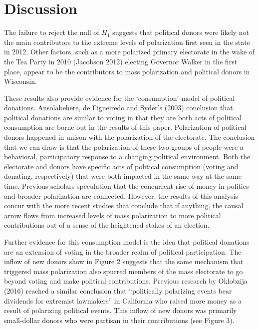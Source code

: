 \documentclass[12pt,]{article}
\begin{document}
\hypertarget{discussion}{%
\section{Discussion}\label{discussion}}

The failure to reject the null of \(H_{1}\) suggests that political
donors were likely not the main contributors to the extreme levels of
polarization first seen in the state in 2012. Other factors, such as a
more polarized primary electorate in the wake of the Tea Party in 2010
(Jacobson 2012) electing Governor Walker in the first place, appear to
be the contributors to mass polarization and political donors in
Wisconsin.

These results also provide evidence for the `consumption' model of
political donations. Ansolabehere, de Figueiredo and Syder's (2003)
conclusion that political donations are similar to voting in that they
are both acts of political consumption are borne out in the results of
this paper. Polarization of political donors happened in unison with the
polarization of the electorate. The conclusion that we can draw is that
the polarization of these two groups of people were a behavioral,
participatory response to a changing political environment. Both the
electorate and donors have specific acts of political consumption
(voting and donating, respectively) that were both impacted in the same
way at the same time. Previous scholars speculation that the concurrent
rise of money in politics and broader polarization are connected.
However, the results of this analysis concur with the more recent
studies that conclude that if anything, the causal arrow flows from
increased levels of mass polarization to more political contributions
out of a sense of the heightened stakes of an election.

Further evidence for this consumption model is the idea that political
donations are an extension of voting in the broader realm of political
participation. The inflow of new donors show in Figure 2 suggests that
the same mechanism that triggered mass polarization also spurred members
of the mass electorate to go beyond voting and make political
contributions. Previous research by Oklobzija (2016) reached a similar
conclusion that ``politically polarizing events bear dividends for
extremist lawmakers'' in California who raised more money as a result of
polarizing political events. This inflow of new donors was primarily
small-dollar donors who were partisan in their contributions (see Figure
3).
\end{document}
